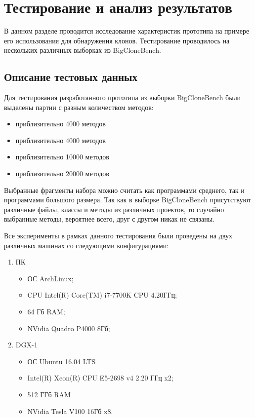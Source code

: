 \chapter{Тестирование и анализ результатов}

В данном разделе проводится исследование характеристик прототипа на примере его использования для обнаружения клонов. Тестирование проводилось на нескольких различных выборках из BigCloneBench.

\section{Описание тестовых данных}

Для тестирования разработанного прототипа из выборки BigCloneBench были выделены партии с разным количеством методов:

\begin{itemize}
\setlength\itemsep{0mm}
\item приблизительно 4000 методов
\item приблизительно 4000 методов
\item приблизительно 10000 методов
\item приблизительно 20000 методов
\end{itemize}

Выбранные фрагменты набора можно считать как программами среднего, так и программами большого размера. Так как в выборке BigCloneBench присутствуют различные файлы, классы и методы из различных проектов, то случайно выбранные методы, вероятнее всего, друг с другом никак не связаны.


Все эксперименты в рамках данного тестирования были проведены на двух различных машинах со следующими конфигурациями:

\begin{enumerate}
\setlength\itemsep{0mm}
\item ПК
\begin{itemize}
\setlength\itemsep{0mm}
\item ОС ArchLinux;
\item CPU Intel(R) Core(TM) i7-7700K CPU 4.20ГГц;
\item 64 Гб RAM;
\item NVidia Quadro P4000 8Гб;
\end{itemize}
\item DGX-1
\begin{itemize}
\setlength\itemsep{0mm}
\item ОС Ubuntu 16.04 LTS
\item Intel(R) Xeon(R) CPU E5-2698 v4 2.20 ГГц x2;
\item 512 ГГб RAM
\item NVidia Tesla V100 16Гб x8.
\end{itemize}
\end{enumerate}

